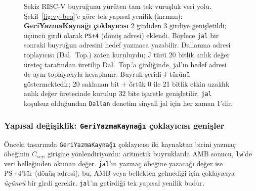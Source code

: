 \begin{figure}[htbp]
\caption[Sekiz RISC-V buyruğunu yürüten tam tek vuruşluk veri yolu]{Sekiz RISC-V buyruğunu yürüten tam tek vuruşluk veri yolu. Şekil~\ref{fig:vy-beq}'e göre tek yapısal yenilik (kırmızı): \textbf{GeriYazmaKaynağı çoklayıcısı} 2 girdiden 3 girdiye genişletildi; üçüncü girdi olarak \texttt{PS+4} (dönüş adresi) eklendi. Böylece \texttt{jal} bir sonraki buyruğun adresini hedef yazmaca yazabilir. Dallanma adresi toplayıcısı (Dal.\ Top.) zaten kuruluydu; J türü 20 bitlik anlık değer üreteç tarafından üretilip Dal.\ Top.'a girdiğinde, jal'ın hedef adresi de aynı toplayıcıyla hesaplanır. Buyruk şeridi J türünü göstermektedir; 20 saklanan bit + örtük 0 ile 21 bitlik etkin uzaklık anlık değer üretecinde kurulup 32 bite işaretle genişletilir. \texttt{jal} koşulsuz olduğundan \texttt{Dallan} denetim sinyali jal için her zaman 1'dir.}
\label{fig:vy-jal}
\end{figure}

\subsubsection*{Yapısal değişiklik: \texttt{GeriYazmaKaynağı} çoklayıcısı genişler}

Önceki tasarımda \texttt{GeriYazmaKaynağı} çoklayıcısı iki kaynaktan birini yazmaç öbeğinin $C_{\text{veri}}$ girişine yönlendiriyordu: aritmetik buyruklarda AMB sonucu, \texttt{lw}'de veri belleğinden okunan değer. \texttt{jal}'ın yazmaç öbeğine yazacağı değer ise PS+4'tür (dönüş adresi); bu, AMB veya bellekten gelmediği için çoklayıcıya \emph{üçüncü} bir girdi gerekir. \texttt{jal}'ın getirdiği tek yapısal yenilik budur.

